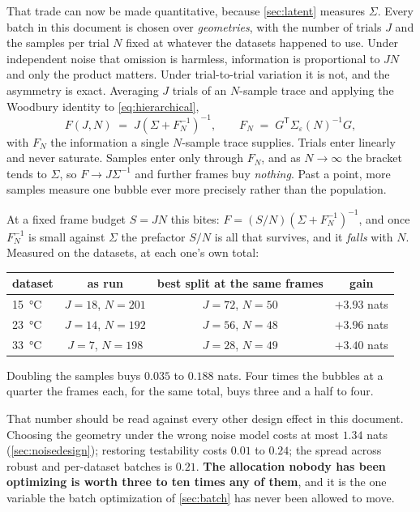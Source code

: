 \documentclass[10pt]{article}
\begin{document}
That trade can now be made quantitative, because \cref{sec:latent} measures $\Sigma$. Every
batch in this document is chosen over \emph{geometries}, with the number of trials $J$ and the
samples per trial $N$ fixed at whatever the datasets happened to use. Under independent noise
that omission is harmless, information is proportional to $JN$ and only the product matters.
Under trial-to-trial variation it is not, and the asymmetry is exact. Averaging $J$ trials of an
$N$-sample trace and applying the Woodbury identity to \eqref{eq:hierarchical},
%
\begin{equation}
F(J, N) \;=\; J\left(\Sigma + F_N^{-1}\right)^{-1},
\qquad F_N \;=\; G^{\mathsf T}\Sigma_\varepsilon(N)^{-1}G ,
\label{eq:allocation}
\end{equation}
%
with $F_N$ the information a single $N$-sample trace supplies. Trials enter linearly and never
saturate. Samples enter only through $F_N$, and as $N \to \infty$ the bracket tends to $\Sigma$,
so $F \to J\Sigma^{-1}$ and further frames buy \emph{nothing}. Past a point, more samples measure
one bubble ever more precisely rather than the population.

At a fixed frame budget $S = JN$ this bites: $F = (S/N)(\Sigma + F_N^{-1})^{-1}$, and once
$F_N^{-1}$ is small against $\Sigma$ the prefactor $S/N$ is all that survives, and it \emph{falls}
with $N$. Measured on the datasets, at each one's own total:

\begin{center}
\begin{tabular}{lccc}
\toprule
dataset & as run & best split at the same frames & gain \\
\midrule
\SI{15}{\celsius} & $J=18$, $N=201$ & $J=72$, $N=50$ & $+3.93$ nats \\
\SI{23}{\celsius} & $J=14$, $N=192$ & $J=56$, $N=48$ & $+3.96$ nats \\
\SI{33}{\celsius} & $J=7$, $N=198$ & $J=28$, $N=49$ & $+3.40$ nats \\
\bottomrule
\end{tabular}
\end{center}

\noindent Doubling the samples buys $0.035$ to $0.188$ nats. Four times the bubbles at a quarter
the frames each, for the same total, buys three and a half to four.

That number should be read against every other design effect in this document. Choosing the
geometry under the wrong noise model costs at most $1.34$ nats (\cref{sec:noisedesign});
restoring testability costs $0.01$ to $0.24$; the spread across robust and per-dataset batches is
$0.21$. \textbf{The allocation nobody has been optimizing is worth three to ten times any of
them}, and it is the one variable the batch optimization of \cref{sec:batch} has never been
allowed to move.
\end{document}
